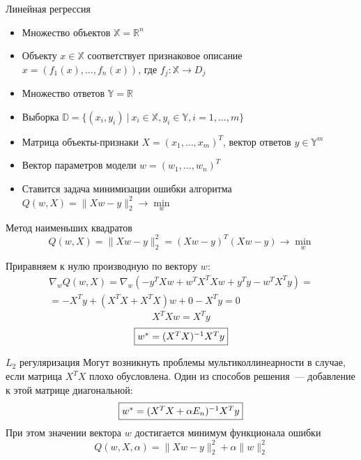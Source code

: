 \documentclass{beamer} %
\newcommand{\R}{\mathbb{R}}
\newcommand{\norm}[1]{\lVert #1 \rVert_2}
\begin{document}
    \begin{frame}{Линейная регрессия}
        \begin{itemize}
            \item Множество объектов $\mathds{X} = \R^n$
            \item Объекту ${x} \in \mathds{X}$ соответствует признаковое описание ${x} = (f_1(x), \ldots, f_n(x))$,
            где $f_j: \mathds{X} \to D_j$ 
            \item Множество ответов $\mathds{Y} = \R$
            \item Выборка $\mathds{D} = \{ ({x}_i, y_i) \ | \ {x}_i \in \mathds{X}, y_i \in \mathds{Y}, i = 1, \ldots, m \}$
            \item Матрица объекты-признаки $X = ({x}_1, \ldots, {x}_m)^T$, вектор ответов ${y} \in \mathds{Y}^m$
            \item Вектор параметров модели ${w} = (w_1, \ldots, w_n)^T$
            \item Ставится задача минимизации ошибки алгоритма $Q({w}, X) = \lVert X {w} - {y} \rVert_2^2 \to \min\limits_{{w}}$
        \end{itemize}
    \end{frame}

    \begin{frame}{Метод наименьших квадратов}
        \[ Q({w}, X) = \lVert X {w} - {y} \rVert_2^2 = (X {w} - {y})^T (X {w} - {y}) \to \min\limits_{{w}} \]

        Приравняем к нулю производную по вектору ${w}$:
        \begin{multline*}
            \nabla_{{w}} Q({w}, X) = \nabla_{{w}}(-{y}^T X {w} + {w}^T X^T X {w} + {y}^T {y} - {w}^T X^T {y}) = \\ 
            = - X^T {y} + (X^T X + X^T X) {w} + 0 - X^T {y} = 0
        \end{multline*}
        \[ X^T X {w} = X^T {y} \]
        \[ \fbox{${w}^* = (X^T X)^{-1} X^T {y}$} \]

    \end{frame}

    \begin{frame}{$L_2$ регуляризация}
        Могут возникнуть проблемы мультиколлинеарности в случае, если матрица $X^T X$ плохо обусловлена.
        Один из способов решения~--- добавление к этой матрице диагональной:
        \[ \fbox{${w}^* = (X^T X + \alpha E_n)^{-1} X^T {y}$} \]
        При этом значении вектора ${w}$ достигается минимум функционала ошибки
        \[ Q({w}, X, \alpha) = \norm{X {w} - {y}}^2 + \alpha \lVert {w} \rVert_2^2 \]
    \end{frame}
\end{document}
